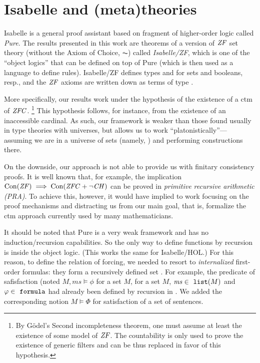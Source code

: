 \section{Isabelle and (meta)theories}
\label{sec:isabelle-metatheories}

Isabelle \cite{Isabelle,DBLP:books/sp/Paulson94} is a general proof
assistant based on fragment of higher-order logic called
\emph{Pure}. %
The results presented in this work are theorems of a
version of $\mathit{ZF}$ set theory (without the Axiom of Choice, $\AC$) 
called \emph{Isabelle/ZF}, which is one of the
``object logics'' that can be defined on top of Pure (which is then
used as a language to define rules). Isabelle/ZF defines types
 and  for sets and booleans, resp., and the $\mathit{ZF}$
axioms are written down as terms of type .

More specifically, our results work under the hypothesis of
the existence of a ctm of $\mathit{ZFC}$.%
\footnote{By Gödel's Second incompleteness theorem, one must assume at
  least the existence of some model of $\mathit{ZF}$. 
  The countability is only used to prove the existence of
  generic filters and can be thus replaced in favor of this
  hypothesis.} 
This hypothesis follows, for instance, from the existence of an
inaccessible cardinal. As such, our framework is weaker than those
found usually in type theories with universes, but allows us to work
``platonistically''--- assuming we are in a universe of sets (namely,
) and performing constructions there.

On the downside, our approach is not able to provide us with finitary
consistency proofs. It is well known that, for example, the
implication $\operatorname{Con}(\mathit{ZF}) \implies \operatorname{Con}(\mathit{ZFC}+\neg\mathit{CH})$ can be proved in
\emph{primitive recursive arithmetic (PRA)}. To achieve this, however,
it would have implied to work focusing on the proof mechanisms
and distracting us from our main goal, that is, formalize the ctm
approach currently used by many mathematicians.

It should be noted that Pure is a very weak framework and has no
induction/recursion capabilities. So the only way to define functions
by recursion is inside the object logic. (This works the same for
Isabelle/HOL.) For this reason, to define the relation of forcing, we
needed to resort to \emph{internalized} first-order formulas: they
form a recursively defined set . For example, the
predicate of safisfaction
(noted $M,\mathit{ms}\models\phi$ for a set $M$, for a set $M$,
$\mathit{ms}\in\isatt{list}(M)$ and $\phi\in\formula$
had already been defined by recursion in \cite{paulson_2003}. We added
the corresponding notion $M\models \Phi$ for satisfaction of a set of
sentences.

